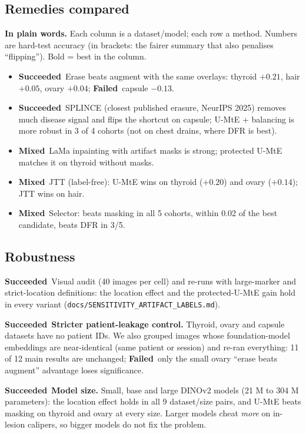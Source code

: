 \documentclass[11pt,a4paper]{article}
\newcommand{\plain}[1]{\par\noindent\colorbox{blue!6}{\parbox{\dimexpr\linewidth-2\fboxsep}{\textbf{In plain words.} #1}}\par\medskip}
\newcommand{\ok}{\textcolor{green!50!black}{\textbf{Succeeded}}}
\newcommand{\no}{\textcolor{red!70!black}{\textbf{Failed}}}
\newcommand{\mixed}{\textcolor{orange!80!black}{\textbf{Mixed}}}
\begin{document}
\subsection{Remedies compared}
\plain{Each column is a dataset/model; each row a method. Numbers are hard-test accuracy (in brackets: the fairer
summary that also penalises ``flipping''). Bold = best in the column.}

\begin{itemize}[leftmargin=*]
\item \ok\ Erase beats augment with the same overlays: thyroid $+0.21$, hair $+0.05$, ovary $+0.04$; \no\ capsule $-0.13$.
\item \ok\ SPLINCE (closest published erasure, NeurIPS 2025) removes much disease signal and flips the shortcut on
capsule; U-MtE + balancing is more robust in 3 of 4 cohorts (not on chest drains, where DFR is best).
\item \mixed\ LaMa inpainting with artifact masks is strong; protected U-MtE matches it on thyroid without masks.
\item \mixed\ JTT (label-free): U-MtE wins on thyroid ($+0.20$) and ovary ($+0.14$); JTT wins on hair.
\item \mixed\ Selector: beats masking in all 5 cohorts, within 0.02 of the best candidate, beats DFR in 3/5.
\end{itemize}

\subsection{Robustness}
\ok\ Visual audit (40 images per cell) and re-runs with large-marker and strict-location definitions: the location
effect and the protected-U-MtE gain hold in every variant (\texttt{docs/SENSITIVITY\_ARTIFACT\_LABELS.md}).

\ok\ \textbf{Stricter patient-leakage control.} Thyroid, ovary and capsule datasets have no patient IDs. We also
grouped images whose foundation-model embeddings are near-identical (same patient or session) and re-ran everything:
11 of 12 main results are unchanged; \no\ only the small ovary ``erase beats augment'' advantage loses significance.

\ok\ \textbf{Model size.} Small, base and large DINOv2 models (21 M to 304 M parameters): the location effect holds
in all 9 dataset/size pairs, and U-MtE beats masking on thyroid and ovary at every size. Larger models cheat
\emph{more} on in-lesion calipers, so bigger models do not fix the problem.
\end{document}
